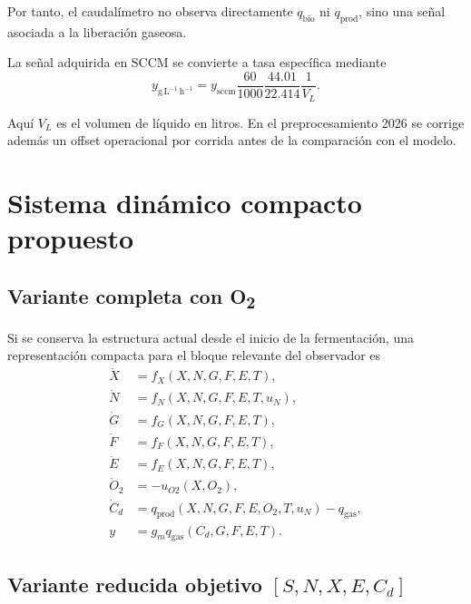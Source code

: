 \documentclass[11pt,a4paper]{article}
\newcommand{\gLh}{\mathrm{g\,L^{-1}\,h^{-1}}}
\begin{document}
Por tanto, el caudalímetro no observa directamente $q_{\mathrm{bio}}$ ni
$q_{\mathrm{prod}}$, sino una señal asociada a la liberación gaseosa.

La señal adquirida en SCCM se convierte a tasa específica mediante
\begin{equation}
\boxed{
y_{\gLh}
=
y_{\mathrm{sccm}}
\frac{60}{1000}
\frac{44.01}{22.414}
\frac{1}{V_L}.
}
\label{eq:sccm}
\end{equation}

Aquí $V_L$ es el volumen de líquido en litros. En el preprocesamiento 2026 se corrige además un
offset operacional por corrida antes de la comparación con el modelo.

\section{Sistema dinámico compacto propuesto}

\subsection{Variante completa con O\textsubscript{2}}

Si se conserva la estructura actual desde el inicio de la fermentación, una representación
compacta para el bloque relevante del observador es
\begin{equation}
\boxed{
\begin{aligned}
\dot X &= f_X(X,N,G,F,E,T),\\
\dot N &= f_N(X,N,G,F,E,T,u_N),\\
\dot G &= f_G(X,N,G,F,E,T),\\
\dot F &= f_F(X,N,G,F,E,T),\\
\dot E &= f_E(X,N,G,F,E,T),\\
\dot O_2 &= -u_{O2}(X,O_2),\\
\dot C_d &= q_{\mathrm{prod}}(X,N,G,F,E,O_2,T,u_N)-q_{\mathrm{gas}},\\
y &= g_m q_{\mathrm{gas}}(C_d,G,F,E,T).
\end{aligned}
}
\label{eq:full_compact}
\end{equation}

\subsection{Variante reducida objetivo $[S,N,X,E,C_d]$}
\end{document}
